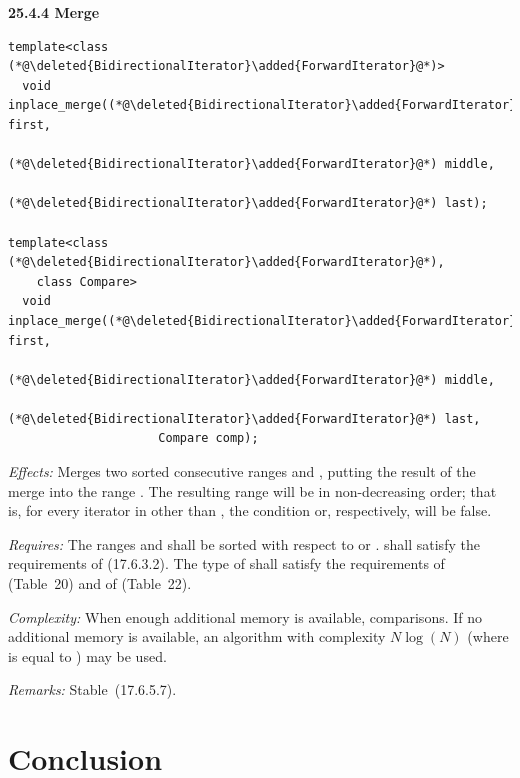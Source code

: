 \documentclass{isocpp_proposal}
\begin{document}
\textbf{25.4.4 Merge}

\begin{lstlisting}
template<class (*@\deleted{BidirectionalIterator}\added{ForwardIterator}@*)>
  void inplace_merge((*@\deleted{BidirectionalIterator}\added{ForwardIterator}@*) first,
                     (*@\deleted{BidirectionalIterator}\added{ForwardIterator}@*) middle,
                     (*@\deleted{BidirectionalIterator}\added{ForwardIterator}@*) last);

template<class (*@\deleted{BidirectionalIterator}\added{ForwardIterator}@*),
    class Compare>
  void inplace_merge((*@\deleted{BidirectionalIterator}\added{ForwardIterator}@*) first,
                     (*@\deleted{BidirectionalIterator}\added{ForwardIterator}@*) middle,                    
                     (*@\deleted{BidirectionalIterator}\added{ForwardIterator}@*) last,
                     Compare comp);
\end{lstlisting}

\begin{itemdescr}
\pnum
\emph{Effects:} Merges two sorted consecutive ranges \tcode{[first, middle)} and \tcode{[middle, last)}, putting the result of the merge into the range \tcode{[first, last)}. The resulting range will be in non-decreasing order; that is, for every iterator  in \tcode{[first, last)} other than , the condition \linebreak {} or, respectively,  will be false.

\pnum
\emph{Requires:} The ranges \tcode{[first, middle)} and \tcode{[middle, last)} shall be sorted with respect to  or .   shall satisfy the requirements of  (17.6.3.2). The type of  shall satisfy the requirements of \linebreak {} (Table~20) and of  (Table~22).

\pnum
\emph{Complexity:} When enough additional memory is available,  comparisons. If no additional memory is available, an algorithm with complexity $N \log{} (N)$ (where  is equal to ) may be used.

\pnum
\emph{Remarks:} Stable~(17.6.5.7).
\end{itemdescr}

\section{Conclusion}
\end{document}
